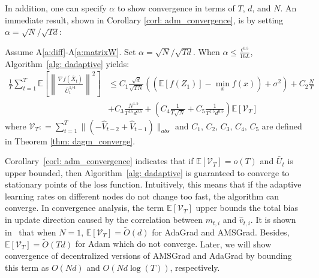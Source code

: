 \documentclass[11pt]{article}
\begin{document}
In addition, one can specify $\alpha$ to show convergence in terms of $T$, $d$, and $N$. 
An immediate result, shown in Corollary \ref{corl: adm_convergence}, is by setting $\alpha = \sqrt{N}/\sqrt{Td}$:
\begin{corollary}\label{corl: adm_convergence}
Assume A\ref{a:diff}-A\ref{a:matrixW}. Set $\alpha = \sqrt{N}/\sqrt{Td}$.
When $\alpha  \leq \frac{\epsilon^{0.5}}{16L} $, Algorithm~\ref{alg: dadaptive} yields:
 {\small
	\begin{align}\label{eq: thm1}
	\frac{1}{T}\sum_{t=1}^T  \mathbb E \left [\left\|\frac{\nabla f( \overline X_{t})}{\overline U_{t}^{1/4}}\right\|^2  \right]
&	\leq   C_1 \frac{\sqrt{d}}{\sqrt{TN}} \left(( \mathbb E  [f( Z_{1})]  -  \min_x  f(x)) +    \sigma^2 \right)  +  C_2 \frac{N}{T} \nonumber \\
	&+  C_3 \frac{N^{1.5}}{T^{1.5}d^{0.5}} 
    +  \left(C_4 \frac{1}{T\sqrt{N}} +  C_5   \frac{1}{T^{1.5}d^{0.5}}\right) \mathbb E \left[\mathcal V_T \right] 
	\end{align}
	}
	where $ \mathcal{V}_T : = \sum_{t=1}^{T}   \|    (- \hat V_{t-2} + \hat V_{t-1} ) \|_{abs}$ and $C_1$, $C_2$, $C_3$, $C_4$,  $C_5$ are defined in Theorem \ref{thm: dagm_converge}.
\end{corollary}
Corollary~\ref{corl: adm_convergence} indicates that if  $  \mathbb E [\mathcal{V}_T  ]  = o(T)$ and $\bar U_t$ is upper bounded, then Algorithm~\ref{alg: dadaptive} is guaranteed to converge to stationary points of the loss function. 
Intuitively, this means that if the adaptive learning rates on different nodes do not change too fast, the algorithm can converge. In convergence analysis, the term $  \mathbb E [\mathcal{V}_T  ] $ upper bounds the total bias in update direction caused by the correlation between $m_{t,i}$ and $\hat v_{t,i}$.
It is shown in~\cite{chen2018convergence} that when $N=1$, $  \mathbb E [\mathcal{V}_T  ]  = \tilde O (d) $ for AdaGrad and AMSGrad. Besides, $\mathbb E [\mathcal{V}_T  ]  = \tilde O (Td) $ for Adam which do not converge.  {Later, we will show convergence of decentralized versions of AMSGrad and AdaGrad by bounding this term as $O(Nd)$ and $O(Nd \log (T))$, respectively.}
\end{document}
